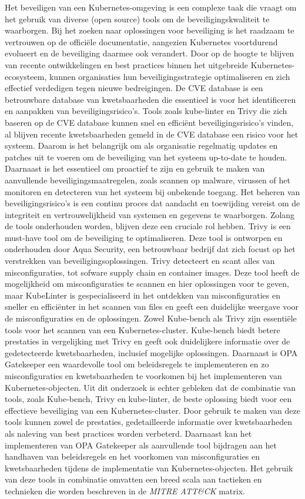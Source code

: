 Het beveiligen van een Kubernetes-omgeving is een complexe taak die vraagt om het gebruik van diverse (open source) tools om de beveiligingskwaliteit te waarborgen. Bij het zoeken naar oplossingen voor beveiliging is het raadzaam te vertrouwen op de officiële documentatie, aangezien Kubernetes voortdurend evolueert en de beveiliging daarmee ook verandert. Door op de hoogte te blijven van recente ontwikkelingen en best practices binnen het uitgebreide Kubernetes-ecosysteem, kunnen organisaties hun beveiligingsstrategie optimaliseren en zich effectief verdedigen tegen nieuwe bedreigingen. De CVE database is een betrouwbare database van kwetsbaarheden die essentieel is voor het identificeren en aanpakken van beveiligingsrisico's. Tools zoals kube-linter en Trivy die zich baseren op de CVE database kunnen snel en efficiënt beveiligingsrisico's vinden, al blijven recente kwetsbaarheden gemeld in de CVE database een risico voor het systeem. Daarom is het belangrijk om als organisatie regelmatig updates en patches uit te voeren om de beveiliging van het systeem up-to-date te houden. Daarnaast is het essentieel om proactief te zijn en gebruik te maken van aanvullende beveiligingsmaatregelen, zoals scannen op malware, virussen of het monitoren en detecteren van het systeem bij onbekende toegang. Het beheren van beveiligingsrisico's is een continu proces dat aandacht en toewijding vereist om de integriteit en vertrouwelijkheid van systemen en gegevens te waarborgen. Zolang de tools onderhouden worden, blijven deze een cruciale rol hebben. Trivy is een must-have tool om de beveiliging te optimaliseren. Deze tool is ontworpen en onderhouden door Aqua Security, een betrouwbaar bedrijf dat zich focust op het verstrekken van beveiligingsoplossingen. Trivy detecteert en scant alles van misconfiguraties, tot sofware supply chain en container images. Deze tool heeft de mogelijkheid om misconfiguraties te scannen en hier oplossingen voor te geven, maar KubeLinter is gespecialiseerd in het ontdekken van misconfiguraties en sneller en efficiënter in het scannen van files en geeft een duidelijke weergave voor de misconfiguraties en de oplossingen. Zowel Kube-bench als Trivy zijn essentiële tools voor het scannen van een Kubernetes-cluster. Kube-bench biedt betere prestaties in vergelijking met Trivy en geeft ook duidelijkere informatie over de gedetecteerde kwetsbaarheden, inclusief mogelijke oplossingen. Daarnaast is OPA Gatekeeper een waardevolle tool om beleidsregels te implementeren en zo misconfiguraties en kwetsbaarheden te voorkomen bij het implementeren van Kubernetes-objecten. Uit dit onderzoek is echter gebleken dat de combinatie van tools, zoals Kube-bench, Trivy en kube-linter, de beste oplossing biedt voor een effectieve beveiliging van een Kubernetes-cluster. Door gebruik te maken van deze tools kunnen zowel de prestaties, gedetailleerde informatie over kwetsbaarheden als naleving van best practices worden verbeterd. Daarnaast kan het implementeren van OPA Gatekeeper als aanvullende tool bijdragen aan het handhaven van beleidsregels en het voorkomen van misconfiguraties en kwetsbaarheden tijdens de implementatie van Kubernetes-objecten. Het gebruik van deze tools in combinatie omvatten een breed scala aan tactieken en technieken die worden beschreven in de \textit{MITRE ATT\&CK} matrix.
